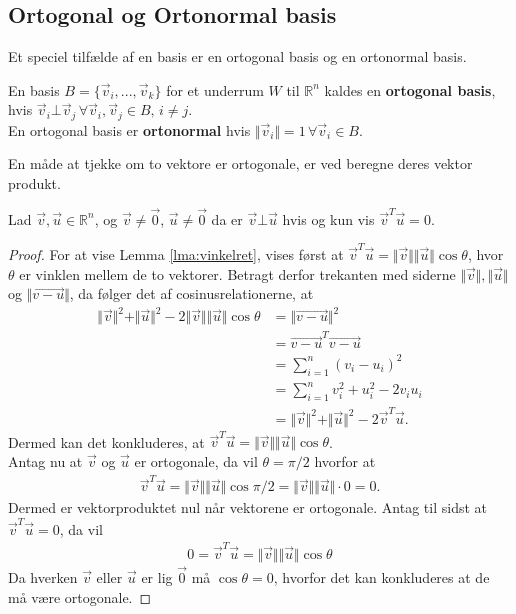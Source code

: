 \subsection{Ortogonal og Ortonormal basis}
Et speciel tilfælde af en basis er en ortogonal basis og en ortonormal basis.
\begin{defn}
En basis $B = \{\vec{v}_i,..., \vec{v}_k\}$ for  et underrum $W$ til $\mathds{R}^n$ kaldes en \textbf{ortogonal basis}, hvis 
$\vec{v}_i \bot \vec{v}_j \, \forall \vec{v}_i, \vec{v}_j \in B, \, i \neq j$.
\\En ortogonal basis er \textbf{ortonormal} hvis $\Vert\vec{v}_i\Vert = 1 \, \forall \vec{v}_i \in B$.
\end{defn}
En måde at tjekke om to vektore er ortogonale, er ved beregne deres vektor produkt.
\begin{lma}
Lad $\vec{v}, \vec{u} \in \mathds{R}^n$, og $\vec{v}\neq \vec{0}$, $\vec{u} \neq \vec{0}$ da er $\vec{v} \bot \vec{u}$ hvis og kun vis $\vec{v}^T\vec{u} = 0$.
\label{lma:vinkelret}
\end{lma}
\begin{proof}
For at vise Lemma \ref{lma:vinkelret}, vises først at $\vec{v}^T\vec{u} = \Vert\vec{v}\Vert\Vert\vec{u}\Vert\cos{\theta}$, hvor $\theta$ er vinklen mellem de to vektorer. 
Betragt derfor trekanten med siderne $\Vert\vec{v}\Vert , \Vert\vec{u}\Vert$ og $\Vert\vec{v-u}\Vert$, da følger det af cosinusrelationerne, at 
\begin{align*}
\Vert\vec{v}\Vert^2 +  \Vert\vec{u}\Vert^2 - 2\Vert\vec{v}\Vert\Vert\vec{u}\Vert\cos{\theta} &= \Vert\vec{v-u}\Vert^2 
\\ &= \vec{v-u}^T\vec{v-u} 
\\&= \sum_{i=1}^n (v_i- u_i)^2 
\\&= \sum_{i=1}^n v_i^2 + u_i^2 - 2 v_iu_i 
\\&= \Vert\vec{v}\Vert^2 +  \Vert\vec{u}\Vert^2 - 2\vec{v}^T\vec{u}.
\end{align*}
Dermed kan det konkluderes,  at $\vec{v}^T\vec{u} = \Vert\vec{v}\Vert\Vert\vec{u}\Vert\cos{\theta}$.
\\Antag nu at $\vec{v}$ og $\vec{u}$ er ortogonale, da vil $\theta= \pi/2$ hvorfor at 
\begin{align*}
\vec{v}^T\vec{u} = \Vert\vec{v}\Vert\Vert\vec{u}\Vert\cos{\pi/2}= \Vert\vec{v}\Vert\Vert\vec{u}\Vert\cdot0 = 0.
\end{align*}
Dermed er vektorproduktet nul når vektorene er ortogonale.
Antag til sidst at $\vec{v}^T\vec{u}=0$, da vil 
\begin{align*}
0 = \vec{v}^T\vec{u} = \Vert\vec{v}\Vert\Vert\vec{u}\Vert\cos{\theta}
\end{align*}
Da hverken $\vec{v}$ eller $\vec{u}$ er lig $\vec{0}$ må $\cos{\theta} = 0 $, hvorfor det kan konkluderes at de må være ortogonale.
\end{proof}
